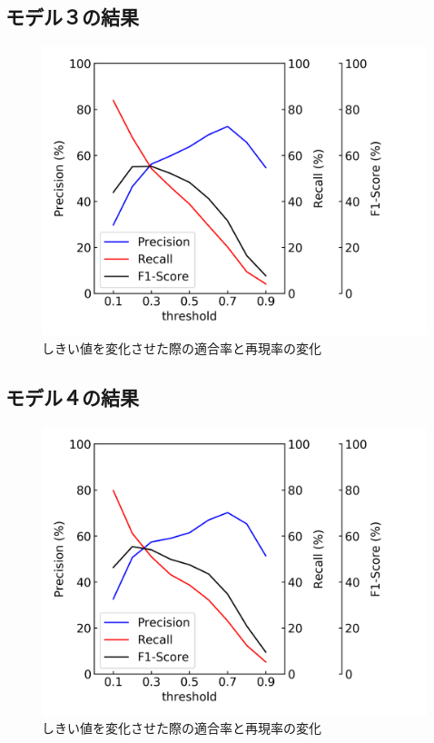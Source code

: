 \subsection{モデル３の結果}
\begin{figure}[htbp]
    \begin{center}
        \includegraphics[width=150mm]{./fig/densenet161threshold.png}
        \caption{しきい値を変化させた際の適合率と再現率の変化}
        \label{fig:densenet161_result_threshold}
    \end{center}
\end{figure}

\newpage
\subsection{モデル４の結果}
\begin{figure}[htbp]
    \begin{center}
        \includegraphics[width=150mm]{./fig/densenet161_ethreshold.png}
        \caption{しきい値を変化させた際の適合率と再現率の変化}
        \label{fig:densenet161_e_result_threshold}
    \end{center}
\end{figure}

